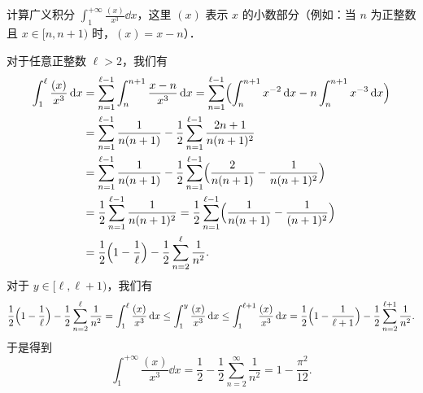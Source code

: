 计算广义积分 $\displaystyle\int_{1}^{+\infty}\frac{(x)}{x^{3}}\dd x$，这里 $(x)$ 表示 $x$ 的小数部分（例如：当 $n$ 为正整数且 $x\in[n,n+1)$ 时，$(x)=x-n$）．
\begin{solution}
对于任意正整数 $\ell>2$，我们有
\begin{align*}
  \int_{1}^{\ell}\frac{(x)}{x^{3}}\,\mathrm{d} x
  &=\sum_{n=1}^{\ell-1}\int_{n}^{n+1}\frac{x-n}{x^{3}}\,\mathrm{d} x
  =\sum_{n=1}^{\ell-1}\Bigl(\int_{n}^{n+1}x^{-2}\,\mathrm{d} x-n\int_{n}^{n+1}x^{-3}\,\mathrm{d} x\Bigr)\\
  &=\sum_{n=1}^{\ell-1}\frac{1}{n(n+1)}-\frac{1}{2}\sum_{n=1}^{\ell-1}\frac{2n+1}{n(n+1)^{2}}\\
  &=\sum_{n=1}^{\ell-1}\frac{1}{n(n+1)}-\frac{1}{2}\sum_{n=1}^{\ell-1}\Bigl(\frac{2}{n(n+1)}-\frac{1}{n(n+1)^{2}}\Bigr)\\
  &=\frac{1}{2}\sum_{n=1}^{\ell-1}\frac{1}{n(n+1)^{2}}
  =\frac{1}{2}\sum_{n=1}^{\ell-1}\Bigl(\frac{1}{n(n+1)}-\frac{1}{(n+1)^{2}}\Bigr)\\
  &=\frac{1}{2}\Bigl(1-\frac{1}{\ell}\Bigr)-\frac{1}{2}\sum_{n=2}^{\ell}\frac{1}{n^{2}}.
\end{align*}
对于 $y\in[\ell,\ell+1)$，我们有
\[
  \frac{1}{2}\Bigl(1-\frac{1}{\ell}\Bigr)-\frac{1}{2}\sum_{n=2}^{\ell}\frac{1}{n^{2}}
  =\int_{1}^{\ell}\frac{(x)}{x^{3}}\,\mathrm{d} x
  \le\int_{1}^{y}\frac{(x)}{x^{3}}\,\mathrm{d} x
  \le\int_{1}^{\ell+1}\frac{(x)}{x^{3}}\,\mathrm{d} x
  =\frac{1}{2}\Bigl(1-\frac{1}{\ell+1}\Bigr)-\frac{1}{2}\sum_{n=2}^{\ell+1}\frac{1}{n^{2}}.
\]
于是得到
\[
  \int_{1}^{+\infty}\frac{(x)}{x^{3}}\dd x=\frac{1}{2}-\frac{1}{2}\sum_{n=2}^{\infty}\frac{1}{n^{2}}=1-\frac{\pi^{2}}{12}.
\]
\end{solution}

